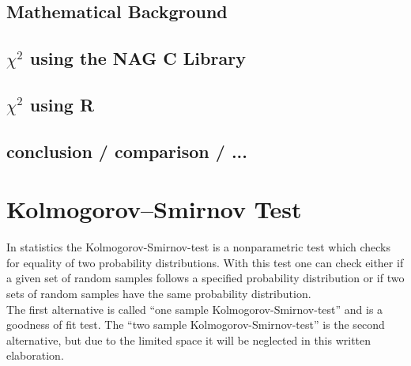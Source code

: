\documentclass{article}
\begin{document}
\subsection{Mathematical Background}
\subsection{$\chi^2$ using the NAG C Library}
\subsection{$\chi^2$ using R}
\subsection{conclusion / comparison / ...}

\section{Kolmogorov–Smirnov Test}
In statistics the Kolmogorov-Smirnov-test is a nonparametric test which checks for equality of two probability distributions.
With this test one can check either if a given set of random samples follows a specified probability distribution or if two sets of random samples have the same probability distribution.\\
The first alternative is called ``one sample Kolmogorov-Smirnov-test'' and is a goodness of fit test. The ``two sample  Kolmogorov-Smirnov-test'' is the second alternative, but due to the limited space it will be neglected in this written elaboration.
\end{document}
